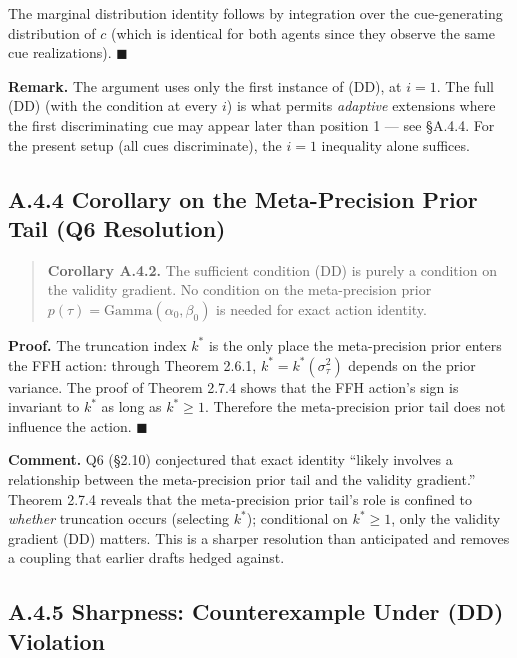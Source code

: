 \documentclass{article}
\begin{document}
The marginal distribution identity follows by integration over the
cue-generating distribution of \(c\) (which is identical for both agents
since they observe the same cue realizations). \(\blacksquare\)

\textbf{Remark.} The argument uses only the first instance of (DD), at
\(i = 1\). The full (DD) (with the condition at every \(i\)) is what
permits \emph{adaptive} extensions where the first discriminating cue
may appear later than position 1 --- see \S{}A.4.4. For the present setup
(all cues discriminate), the \(i=1\) inequality alone suffices.

\subsection{A.4.4 Corollary on the Meta-Precision Prior Tail (Q6
Resolution)}\label{a.4.4-corollary-on-the-meta-precision-prior-tail-q6-resolution}

\begin{quote}
\textbf{Corollary A.4.2.} The sufficient condition (DD) is purely a
condition on the validity gradient. No condition on the meta-precision
prior \(p(\tau) = \mathrm{Gamma}(\alpha_{0}, \beta_{0})\) is needed for
exact action identity.
\end{quote}

\textbf{Proof.} The truncation index \(k^{*}\) is the only place the
meta-precision prior enters the FFH action: through Theorem 2.6.1,
\(k^{*} = k^{*}(\sigma_{\tau}^{2})\) depends on the prior variance. The
proof of Theorem 2.7.4 shows that the FFH action's sign is invariant to
\(k^{*}\) as long as \(k^{*} \geq 1\). Therefore the meta-precision
prior tail does not influence the action. \(\blacksquare\)

\textbf{Comment.} Q6 (\S{}2.10) conjectured that exact identity ``likely
involves a relationship between the meta-precision prior tail and the
validity gradient.'' Theorem 2.7.4 reveals that the meta-precision prior
tail's role is confined to \emph{whether} truncation occurs (selecting
\(k^{*}\)); conditional on \(k^{*} \geq 1\), only the validity gradient
(DD) matters. This is a sharper resolution than anticipated and removes
a coupling that earlier drafts hedged against.

\subsection{A.4.5 Sharpness: Counterexample Under (DD)
Violation}\label{a.4.5-sharpness-counterexample-under-dd-violation}
\end{document}
